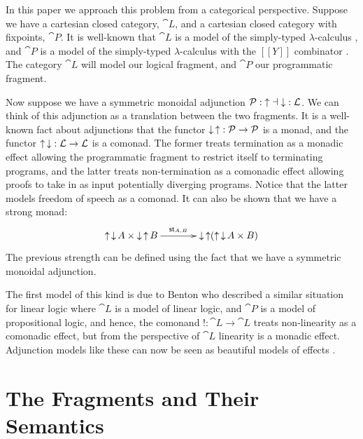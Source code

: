 In this paper we approach this problem from a categorical
perspective. Suppose we have a cartesian closed category, $\cat{L}$,
and a cartesian closed category with fixpoints, $\cat{P}$.  It is
well-known that $\cat{L}$ is a model of the simply-typed
$\lambda$-calculus \cite{?}, and $\cat{P}$ is a model of the
simply-typed $\lambda$-calculus with the $[[Y]]$ combinator \cite{?}.
The category $\cat{L}$ will model our logical fragment, and $\cat{P}$
our programmatic fragment.

Now suppose we have a symmetric monoidal adjunction $\mathcal{P} : \mathop{\uparrow}
\dashv \mathop{\downarrow} : \mathcal{L}$. We can think of this adjunction as a
translation between the two fragments.  It is a well-known fact about
adjunctions that the functor $\mathop{\downarrow}\mathop{\uparrow} : \mathcal{P} \rightarrow \mathcal{P}$ is a
monad, and the functor $\mathop{\uparrow}\mathop{\downarrow} : \mathcal{L} \rightarrow \mathcal{L}$ is a comonad.
The former treats termination as a monadic effect allowing the
programmatic fragment to restrict itself to terminating programs, and
the latter treats non-termination as a comonadic effect allowing
proofs to take in as input potentially diverging programs.  Notice
that the latter models freedom of speech as a comonad.  It can also be
shown that we have a strong monad:
\[
\bfig
\morphism<1000,0>[\uar\dar A \times \dar\uar B`\dar\uar(\uar\dar A \times B);\st{A,B}]
\efig
\]
The previous strength can be defined using the fact that we have a
symmetric monoidal adjunction.

The first model of this kind is due to Benton \cite{??} who described
a similar situation for linear logic where $\cat{L}$ is a model of
linear logic, and $\cat{P}$ is a model of propositional logic, and
hence, the comonand $! : \cat{L} \to \cat{L}$ treats non-linearity as
a comonadic effect, but from the perspective of $\cat{L}$ linearity is
a monadic effect.  Adjunction models like these can now be seen as
beautiful models of effects \cite{POPL:2016}.

\section{The Fragments and Their Semantics}
\label{sec:the_fragments_and_their_semantics}

